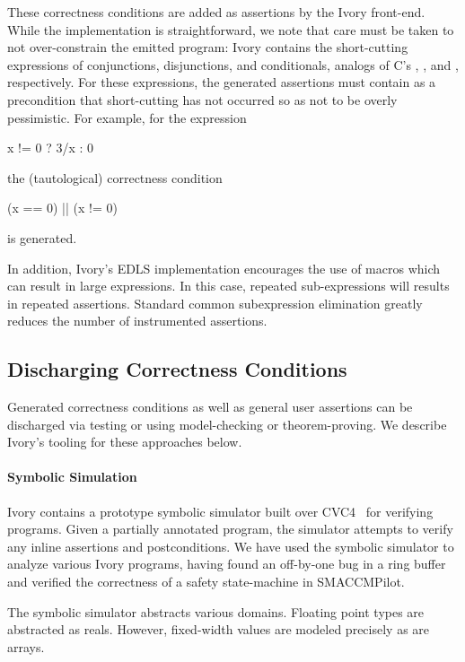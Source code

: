 These correctness conditions are added as assertions by the Ivory
front-end.  While the implementation is straightforward, we note that
care must be taken to not over-constrain the emitted program: 
 Ivory contains
the short-cutting expressions of conjunctions, disjunctions, and conditionals,
analogs of C's \cd{\&\&}, \cd{||}, and , respectively. For these
expressions, the generated assertions must contain as a precondition that
short-cutting has not occurred so as not to be overly pessimistic. For example,
for the expression
\noindent
\begin{code}
x != 0 ? 3/x : 0
\end{code}
\noindent
the (tautological) correctness condition
\begin{code}
(x == 0) || (x != 0)
\end{code}
\noindent
is generated.


In addition, Ivory's EDLS implementation encourages the use of macros
which can result in large expressions. In this case, repeated
sub-expressions will results in repeated assertions.  Standard common
subexpression elimination greatly reduces the number of
instrumented assertions.

\subsection{Discharging Correctness Conditions}

Generated correctness conditions as well as general user assertions can be
discharged via testing or using model-checking or theorem-proving. We describe
Ivory's tooling for these approaches below.

\paragraph{Symbolic Simulation}

Ivory contains a prototype symbolic simulator built over
CVC4~\cite{cvc4} for verifying programs.  Given a partially annotated
program, the simulator attempts to verify any inline assertions and
postconditions.  We have used the symbolic simulator to analyze
various Ivory programs, having found an off-by-one bug in a ring
buffer and verified the correctness of a safety state-machine in
SMACCMPilot.

The symbolic simulator abstracts various domains. Floating point types
are abstracted as reals. However, fixed-width values are modeled
precisely as are arrays.

